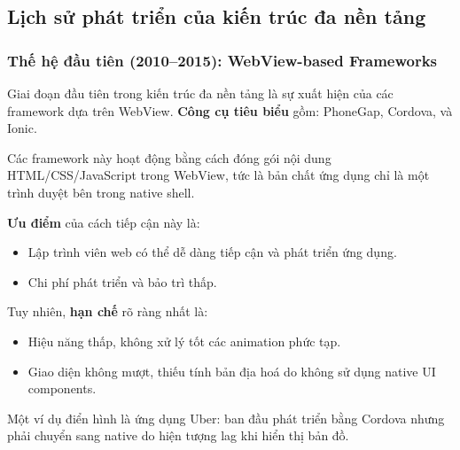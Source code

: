\subsection{Lịch sử phát triển của kiến trúc đa nền tảng}
\renewcommand{\labelitemi}{--}    
\begin{flushleft}

  \subsubsection{Thế hệ đầu tiên (2010–2015): WebView-based Frameworks}
  
  \begin{flushleft}
    Giai đoạn đầu tiên trong kiến trúc đa nền tảng là sự xuất hiện của các framework dựa trên WebView. 
    \textbf{Công cụ tiêu biểu} gồm: PhoneGap, Cordova, và Ionic.
  \end{flushleft}

  \begin{flushleft}
    Các framework này hoạt động bằng cách đóng gói nội dung HTML/CSS/JavaScript trong WebView, 
    tức là bản chất ứng dụng chỉ là một trình duyệt bên trong native shell.
  \end{flushleft}

  \begin{flushleft}
    \textbf{Ưu điểm} của cách tiếp cận này là:
    \setlength{\leftmargini}{1.5cm}
    \begin{itemize}
      \item Lập trình viên web có thể dễ dàng tiếp cận và phát triển ứng dụng.
      \item Chi phí phát triển và bảo trì thấp.
    \end{itemize}
  \end{flushleft}

  \begin{flushleft}
    Tuy nhiên, \textbf{hạn chế} rõ ràng nhất là:
    \setlength{\leftmargini}{1.5cm}
    \begin{itemize}
      \item Hiệu năng thấp, không xử lý tốt các animation phức tạp.
      \item Giao diện không mượt, thiếu tính bản địa hoá do không sử dụng native UI components.
    \end{itemize}
  \end{flushleft}

  \begin{flushleft}
    Một ví dụ điển hình là ứng dụng Uber: 
    ban đầu phát triển bằng Cordova nhưng phải chuyển sang native do hiện tượng lag khi hiển thị bản đồ.
  \end{flushleft}


\end{flushleft}
